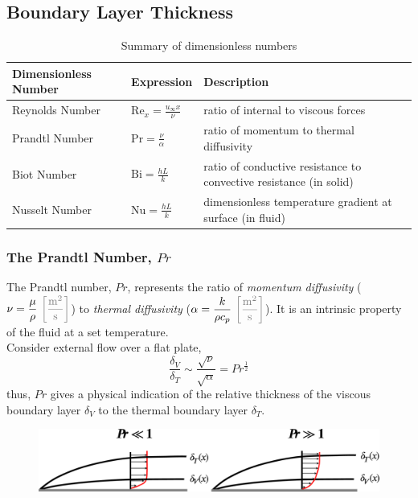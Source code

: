 \documentclass[12pt, a4paper]{article}
\numberwithin{equation}{subsection}
\newcommand{\Bi}{\mathrm{Bi}}
\begin{document}
\subsection{Boundary Layer Thickness}
\begin{table}[H]
    \centering
    \begin{tabularx}{\textwidth}{p{} p{} p{}}
    \toprule
        \textbf{Dimensionless Number} & \textbf{Expression} & \textbf{Description}  \\
    \midrule
        Reynolds Number & $\displaystyle \mathrm{Re}_{x} = \frac{u_{\infty}x}{\nu}$ & ratio of internal to viscous forces \\ [1em]
        
        Prandtl Number & $\displaystyle \mathrm{Pr} = \frac{\nu}{\alpha}$ & ratio of momentum to thermal diffusivity \\ [1em]
        
        Biot Number & $\displaystyle \Bi = \frac{hL}{k}$ & ratio of conductive resistance to convective resistance (in solid) \\ [1em]
        
        Nusselt Number & $\displaystyle \mathrm{Nu} = \frac{hL}{k}$ & dimensionless temperature gradient at surface (in fluid) \\
    \bottomrule
    \end{tabularx}
    \caption{Summary of dimensionless numbers}
    \label{tab:my_label}
\end{table}

\subsubsection{The Prandtl Number, $Pr$}
The Prandtl number, $Pr$, represents the ratio of \textit{momentum diffusivity} ($\displaystyle \nu = \frac{\mu}{\rho} \ {\color{gray}\bigg[ \frac{\mathrm{m}^2}{\mathrm{s}} \bigg]}$) to \textit{thermal diffusivity} ($\displaystyle \alpha = \frac{k}{\rho c_p} \ {\color{gray}\bigg[ \frac{\mathrm{m}^2}{\mathrm{s}}\bigg]}$). It is an intrinsic property of the fluid at a set temperature.\\

Consider external flow over a flat plate, 
\[
    \frac{\delta_V}{\delta_T} \sim \frac{\sqrt{\nu}}{\sqrt{\alpha}} = Pr^{\frac{1}{2}}
\]
thus, $Pr$ gives a physical indication of the relative thickness of the viscous boundary layer $\delta_V$ to the thermal boundary layer $\delta_T$.
\begin{figure}[H]
    \centering
    \includegraphics[width=.8\textwidth]{img/prandtl_number_boundary_layer.eps}
\end{figure}
\end{document}
